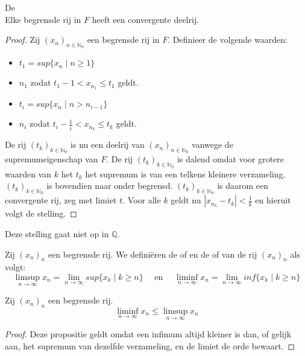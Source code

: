 \documentclass[main.tex]{subfiles}
\begin{document}
\begin{st}
  \label{st:bolzano-rijen}
  De \\
  Elke begrensde rij in $F$ heeft een convergente deelrij.

  \begin{proof}
    Zij $(x_{n})_{n\in\mathbb{N}_{0}}$ een begrensde rij in $F$.
    Definieer de volgende waarden:
    \begin{itemize}
    \item $t_{1} = sup\{ x_{n} \mid n \ge 1 \}$
    \item $n_{1}$ zodat $t_1-1 < x_{n_{1}} \le t_{1}$ geldt.
    \item $t_{i} = sup\{ x_{n} \mid n > n_{i-1} \}$
    \item $n_{i}$ zodat $t_{i}-\frac{1}{i} < x_{n_{k}} \le t_{k}$ geldt.
    \end{itemize}
    De rij $(t_{k})_{k\in \mathbb{N}_{0}}$ is nu een deelrij van $(x_{n})_{n\in\mathbb{N}_{0}}$ vanwege de supremumeigenschap van $F$.\needed
    De rij $(t_{k})_{k\in \mathbb{N}_{0}}$ is dalend omdat voor grotere waarden van $k$ het $t_{k}$ het supremum is van een telkens kleinere verzameling.
    $(t_{k})_{k\in \mathbb{N}_{0}}$ is bovendien naar onder begrensd.\waarom
    $(t_{k})_{k\in \mathbb{N}_{0}}$ is daarom een convergente rij, zeg met limiet $t$.
    Voor alle $k$ geldt nu $|x_{n_{k}} -t_{k}| < \frac{1}{k}$ en hieruit volgt de stelling.
  \end{proof}
\end{st}

\begin{opm}
  Deze stelling gaat niet op in $\mathbb{Q}$.
\end{opm}

\begin{de}
  Zij $(x_{n})_{n}$ een begrensde rij.
  We defini\"eren de  of  en de  of  van de rij $(x_{n})_{n}$ als volgt:
  \[ \limsup_{n\rightarrow \infty} x_{n} = \lim_{n\rightarrow \infty} sup\{x_{k}\mid k\ge n\} \quad\text{ en }\quad \liminf_{n\rightarrow \infty} x_{n} = \lim_{n\rightarrow \infty} inf\{ x_{k}\mid k\ge n\} \]
\end{de}

\begin{pr}
  Zij $(x_{n})_{n}$ een begrensde rij.
  \[ \liminf_{n\rightarrow \infty} x_{n} \le \limsup_{n\rightarrow \infty} x_{n} \]
  \begin{proof}
    Deze propositie geldt omdat een infimum altijd kleiner is dan, of gelijk aan, het supremum van dezelfde verzameling\needed, en de limiet de orde bewaart.
  \end{proof}
\end{pr}
\end{document}
